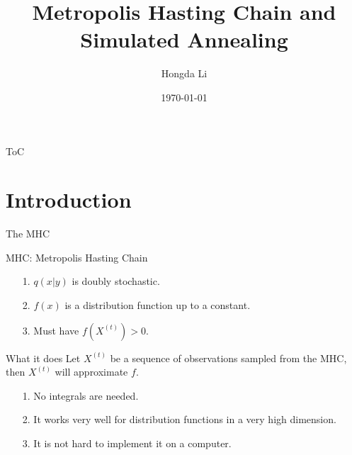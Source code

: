 \documentclass[11pt]{beamer}
\author{Hongda Li}
\title{Metropolis Hasting Chain and Simulated Annealing}
\institute[]{UBC Okanagan}
\date{\today}
\begin{document}
\begin{frame}
    \titlepage
\end{frame}

\begin{frame}{ToC}
    \tableofcontents
\end{frame}

\section{Introduction}

    \begin{frame}{The MHC}
        \begin{block}{MHC: Metropolis Hasting Chain}
            \begin{algorithmic}[H]
            \end{algorithmic}
        \end{block}
        \begin{itemize}
            \item [1.] $q(x|y)$ is doubly stochastic. 
            \item [2.] $f(x)$ is a distribution function up to a constant. 
            \item [3.] Must have $f(X^{(t)}) > 0$. 
        \end{itemize}
    \end{frame}
    \begin{frame}{What it does}
        Let $X^{(t)}$ be a sequence of observations sampled from the MHC, then $X^{(t)}$ will approximate $f$. 
        \begin{itemize}
            \item [1.] No integrals are needed. 
            \item [2.] It works very well for distribution functions in a very high dimension. 
            \item [3.] It is not hard to implement it on a computer. 
        \end{itemize}
    \end{frame}
\end{document}
